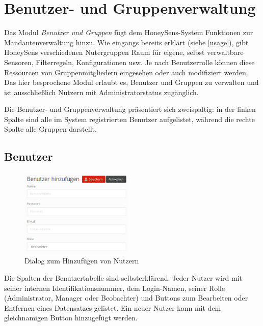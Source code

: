 \documentclass[12pt]{article}
\begin{document}
\section{Benutzer- und Gruppenverwaltung}
Das Modul \textit{Benutzer und Gruppen} fügt dem HoneySens-System Funktionen zur Mandantenverwaltung hinzu. Wie eingangs bereits erklärt (siehe \ref{usage}), gibt HoneySens verschiedenen Nutergruppen Raum für eigene, selbst verwaltbare Sensoren, Filterregeln, Konfigurationen usw. Je nach Benutzerrolle können diese Ressourcen von Gruppenmitgliedern eingesehen oder auch modifiziert werden. Das hier besprochene Modul erlaubt es, Benutzer und Gruppen zu verwalten und ist ausschließlich Nutzern mit Administratorstatus zugänglich.

Die Benutzer- und Gruppenverwaltung präsentiert sich zweispaltig: in der linken Spalte sind alle im System registrierten Benutzer aufgelistet, während die rechte Spalte alle Gruppen darstellt.

\subsection{Benutzer} \label{users}

\begin{figure}
				\vspace{-15pt}
				\centering
				\includegraphics[width=0.48\textwidth]{./graphics/user-create.png}
				\vspace{-5pt}
				\caption{Dialog zum Hinzufügen von Nutzern}
				\label{fig:user-create}
\end{figure}

Die Spalten der Benutzertabelle sind selbsterklärend: Jeder Nutzer wird mit seiner internen Identifikationsnummer, dem Login-Namen, seiner Rolle (Administrator, Manager oder Beobachter) und Buttons zum Bearbeiten oder Entfernen eines Datensatzes gelistet. Ein neuer Nutzer kann mit dem gleichnamigen Button hinzugefügt werden.
\end{document}
